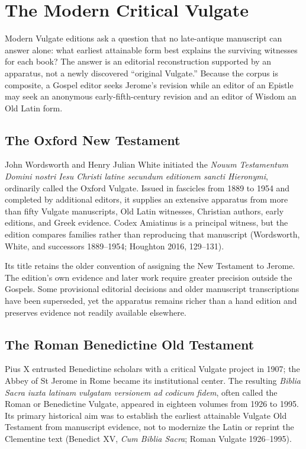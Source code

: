 \section{The Modern Critical Vulgate}

Modern Vulgate editions ask a question that no late-antique manuscript can answer alone: what earliest attainable form best explains the surviving witnesses for each book? The answer is an editorial reconstruction supported by an apparatus, not a newly discovered ``original Vulgate.'' Because the corpus is composite, a Gospel editor seeks Jerome's revision while an editor of an Epistle may seek an anonymous early-fifth-century revision and an editor of Wisdom an Old Latin form.

\subsection{The Oxford New Testament}

John Wordsworth and Henry Julian White initiated the \emph{Nouum Testamentum Domini nostri Iesu Christi latine secundum editionem sancti Hieronymi}, ordinarily called the Oxford Vulgate. Issued in fascicles from 1889 to 1954 and completed by additional editors, it supplies an extensive apparatus from more than fifty Vulgate manuscripts, Old Latin witnesses, Christian authors, early editions, and Greek evidence. Codex Amiatinus is a principal witness, but the edition compares families rather than reproducing that manuscript (Wordsworth, White, and successors 1889--1954; Houghton 2016, 129--131).

Its title retains the older convention of assigning the New Testament to Jerome. The edition's own evidence and later work require greater precision outside the Gospels. Some provisional editorial decisions and older manuscript transcriptions have been superseded, yet the apparatus remains richer than a hand edition and preserves evidence not readily available elsewhere.

\subsection{The Roman Benedictine Old Testament}

Pius X entrusted Benedictine scholars with a critical Vulgate project in 1907; the Abbey of St Jerome in Rome became its institutional center. The resulting \emph{Biblia Sacra iuxta latinam vulgatam versionem ad codicum fidem}, often called the Roman or Benedictine Vulgate, appeared in eighteen volumes from 1926 to 1995. Its primary historical aim was to establish the earliest attainable Vulgate Old Testament from manuscript evidence, not to modernize the Latin or reprint the Clementine text (Benedict XV, \emph{Cum Biblia Sacra}; Roman Vulgate 1926--1995).


